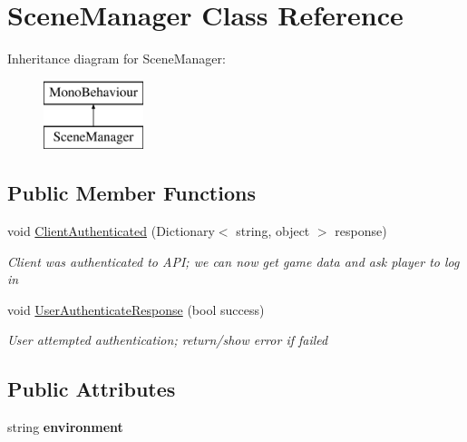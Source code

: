 \hypertarget{class_scene_manager}{}\section{Scene\+Manager Class Reference}
\label{class_scene_manager}
Inheritance diagram for Scene\+Manager\+:\begin{figure}[H]
\begin{center}
\leavevmode
\includegraphics[height=2.000000cm]{class_scene_manager}
\end{center}
\end{figure}
\subsection*{Public Member Functions}
\begin{DoxyCompactItemize}
\item 
void \hyperlink{class_scene_manager_ab402cd27ce43636fedcd3e5fc09eb02c}{Client\+Authenticated} (Dictionary$<$ string, object $>$ response)
\begin{DoxyCompactList}\small\item\em Client was authenticated to A\+PI; we can now get game data and ask player to log in \end{DoxyCompactList}\item 
void \hyperlink{class_scene_manager_a6fd5c1172a1b8501fe96310a8ebd0b34}{User\+Authenticate\+Response} (bool success)
\begin{DoxyCompactList}\small\item\em User attempted authentication; return/show error if failed \end{DoxyCompactList}\end{DoxyCompactItemize}
\subsection*{Public Attributes}
\begin{DoxyCompactItemize}
\item 
string {\bfseries environment}\hypertarget{class_scene_manager_ae8b69f9e6bf2f57497cd6ad69defc83e}{}\label{class_scene_manager_ae8b69f9e6bf2f57497cd6ad69defc83e}

\end{DoxyCompactItemize}


